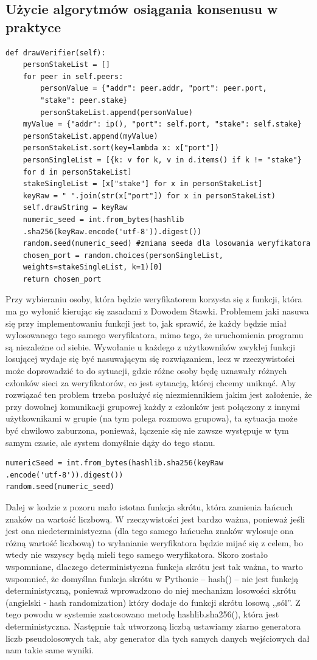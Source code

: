 \subsection{Użycie algorytmów osiągania konsenusu w praktyce}
\begin{lstlisting}
def drawVerifier(self):
    personStakeList = []
    for peer in self.peers:
        personValue = {"addr": peer.addr, "port": peer.port,
        "stake": peer.stake}
        personStakeList.append(personValue)
    myValue = {"addr": ip(), "port": self.port, "stake": self.stake}
    personStakeList.append(myValue)
    personStakeList.sort(key=lambda x: x["port"])
    personSingleList = [{k: v for k, v in d.items() if k != "stake"} 
    for d in personStakeList]
    stakeSingleList = [x["stake"] for x in personStakeList]
    keyRaw = " ".join(str(x["port"]) for x in personStakeList)
    self.drawString = keyRaw
    numeric_seed = int.from_bytes(hashlib
    .sha256(keyRaw.encode('utf-8')).digest())
    random.seed(numeric_seed) #zmiana seeda dla losowania weryfikatora
    chosen_port = random.choices(personSingleList, 
    weights=stakeSingleList, k=1)[0]
    return chosen_port
\end{lstlisting}
Przy wybieraniu osoby, która będzie weryfikatorem korzysta się z funkcji, która ma go wyłonić kierując się zasadami z Dowodem Stawki. Problemem jaki nasuwa się przy implementowaniu funkcji jest to, jak sprawić, że każdy będzie miał wylosowanego tego samego weryfikatora, mimo tego, że uruchomienia programu są niezależne od siebie. Wywołanie u każdego z użytkowników zwykłej funkcji losującej wydaje się być nasuwającym się rozwiązaniem, lecz w rzeczywistości może doprowadzić to do sytuacji, gdzie różne osoby będę uznawały różnych członków sieci za weryfikatorów, co jest sytuacją, której chcemy uniknąć. Aby rozwiązać ten problem trzeba posłużyć się niezmiennikiem jakim jest założenie, że przy dowolnej komunikacji grupowej każdy z członków jest połączony z innymi użytkownikami w grupie (na tym polega rozmowa grupowa), ta sytuacja może być chwilowo zaburzona, ponieważ, łączenie się nie zawsze występuje w tym samym czasie, ale system domyślnie dąży do tego stanu.
\begin{lstlisting}
numericSeed = int.from_bytes(hashlib.sha256(keyRaw
.encode('utf-8')).digest())
random.seed(numeric_seed)
\end{lstlisting}
Dalej w kodzie z pozoru mało istotna funkcja skrótu, która zamienia łańcuch znaków na wartość liczbową. W rzeczywistości jest bardzo ważna, ponieważ jeśli jest ona niedeterministyczna (dla tego samego łańcucha znaków wylosuje ona różną wartość liczbową) to wyłanianie weryfikatora będzie mijać się z celem, bo wtedy nie wszyscy będą mieli tego samego weryfikatora. Skoro zostało wspomniane, dlaczego deterministyczna funkcja skrótu jest tak ważna, to warto wspomnieć, że domyślna funkcja skrótu w Pythonie – hash() – nie jest funkcją deterministyczną, ponieważ wprowadzono do niej mechanizm losowości skrótu (angielski - hash randomization) który dodaje do funkcji skrótu losową ,,sól”. Z tego powodu w systemie zastosowano metodę hashlib.sha256(), która jest deterministyczna. Następnie tak utworzoną liczbą ustawiamy ziarno generatora liczb pseudolosowych tak, aby generator dla tych samych danych wejściowych dał nam takie same wyniki.

